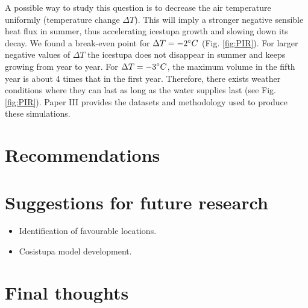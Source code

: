 A possible way to study this question is to decrease the air temperature uniformly (temperature change $\Delta
T$). This will imply a stronger negative sensible heat flux in summer, thus accelerating icestupa growth and
slowing down its decay. We found a break-even point for $\Delta T = -2 ^{\circ} C$ (Fig. \ref{fig:PIR}). For
larger negative values of $\Delta T$ the icestupa does not disappear in summer and keeps growing from year to
year. For $\Delta T = -3 ^{\circ} C$, the maximum volume in the fifth year is about 4 times that in the first
year. Therefore, there exists weather conditions where they can last as long as the water supplies last (see
Fig. \ref{fig:PIR}). Paper III provides the datasets and methodology used to produce these simulations.


\section{Recommendations}

\section{Suggestions for future research}

\begin{itemize} 

\item Identification of favourable locations.

\item Cosistupa model development.

\end{itemize}

\section{Final thoughts}





